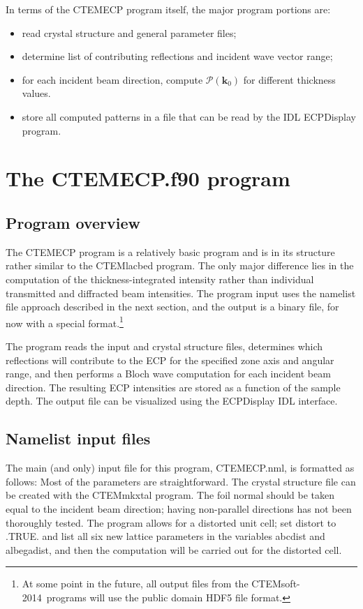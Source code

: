 \documentclass[DIV=calc, paper=letter, fontsize=11pt]{scrartcl}	 %
\newcommand{\ctp}{\textsf{CTEMsoft-2014}}
\begin{document}
In terms of the \textsf{CTEMECP} program itself, the major program portions are:
\begin{itemize}
	\item read crystal structure and general parameter files;
	\item determine list of contributing reflections and incident wave vector range;
	\item for each incident beam direction, compute $\mathcal{P}(\mathbf{k}_0)$ for 
	different thickness values.
	\item store all computed patterns in a file that can be read by the IDL \textsf{ECPDisplay} program.
\end{itemize}

\section{The \protect\textsf{CTEMECP.f90} program\label{sec:f90ecp}}

\subsection{Program overview\label{sec:f90overviewecp}}
The \textsf{CTEMECP} program is a relatively basic program and is in its structure rather similar to the \textsf{CTEMlacbed} program.
The only major difference lies in the computation of the thickness-integrated intensity rather than individual transmitted and 
diffracted beam intensities.  The program input uses the namelist file approach described in the next section, and the output is a 
binary file, for now with a special format.\footnote{At some point in the future, all output files from the \ctp\ programs will use
the public domain HDF5 file format.}  

The program reads the input and crystal structure files, determines which reflections will contribute to the ECP for the specified zone
axis and angular range, and then performs
a Bloch wave computation for each incident beam direction.  The resulting ECP intensities are stored as a function of the sample depth.
The output file can be visualized using the \textsf{ECPDisplay} IDL interface.

\subsection{Namelist input files\label{sec:f90inputecp}}
The main (and only) input file for this program, \textsf{CTEMECP.nml}, is formatted as follows:
Most of the parameters are straightforward.  The crystal structure file can be created with 
the \textsf{CTEMmkxtal} program.  The foil normal should be taken equal to the incident beam direction; having non-parallel 
directions has not been thoroughly tested.  The program allows for a distorted unit cell; set \textsf{distort} to \textsf{.TRUE.}
and list all six new lattice parameters in the variables \textsf{abcdist} and \textsf{albegadist}, and then the computation will
be carried out for the distorted cell.
\end{document}
